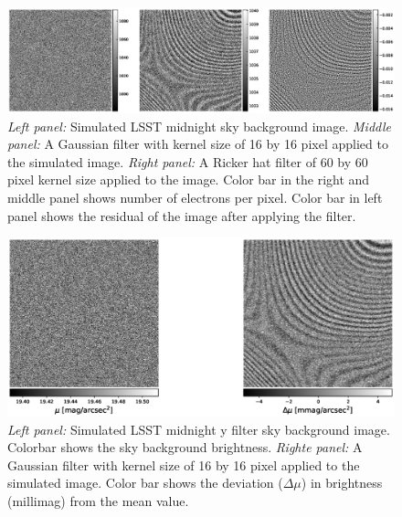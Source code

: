 \documentclass[twocolumn]{aastex63} %
\begin{document}
\begin{CJK*}{UTF8}{gbsn}
\begin{figure}[tbh]
\centering
\includegraphics[scale = 0.4]{LSST-skybg-image.eps}
\caption{{\it Left panel:} Simulated LSST midnight sky background image. {\it Middle panel:} A Gaussian filter with kernel size of 16 by 16 pixel applied to the simulated image. {\it Right panel:} A Ricker hat filter of 60 by 60 pixel kernel size applied to the image. Color bar in the right and middle panel shows number of electrons per pixel. Color bar in left panel shows the residual of the image after applying the filter.}
\label{fig:lsst-image}
\end{figure}

\begin{figure}[tbh]
\centering
\includegraphics[scale = 0.45]{LSST-skybg-mag-image.eps}
\caption{{\it Left panel:} Simulated LSST midnight y filter sky background image. Colorbar shows the sky background brightness. {\it Righte panel:} A Gaussian filter with kernel size of 16 by 16 pixel applied to the simulated image.  Color bar shows the deviation ($\Delta \mu$) in brightness (millimag) from the mean value.}
\label{fig:lsst-image}
\end{figure}


\end{CJK*}
\end{document}
